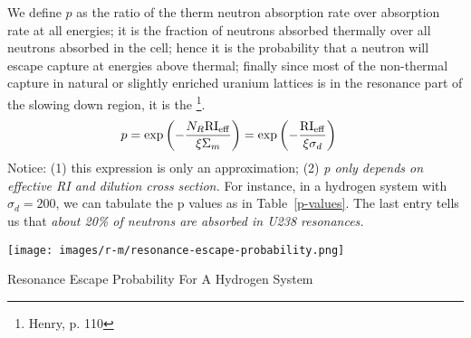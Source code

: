 \documentclass{school-22.211-notes}
\begin{document}
\clearpage
{}
We define $p$ as the ratio of the therm neutron absorption rate over absorption rate at all energies; it is the fraction of neutrons absorbed thermally over all neutrons absorbed in the cell; hence it is the probability that a neutron will escape capture at energies above thermal; finally since most of the non-thermal capture in natural or slightly enriched uranium lattices is in the resonance part of the slowing down region, it is the \footnote{Henry, p. 110}. 
\begin{align}
p &= \exp \left( - \frac{N_R \mathrm{RI}_{\mathrm{eff}}}{\xi \Sigma_m} \right)  = \exp \left( - \frac{\mathrm{RI}_{\mathrm{eff}}}{\xi \sigma_d} \right)
\end{align}
Notice: (1) this expression is only an approximation; (2) \textit{p only depends on effective RI and dilution cross section.} For instance, in a hydrogen system with $\sigma_d = 200$, we can tabulate the p values as in Table~\ref{p-values}. The last entry tells us that \textit{about 20\% of neutrons are absorbed in U238 resonances.}
\begin{table}
  \centering
  \texttt{[image: images/r-m/resonance-escape-probability.png]}
  \caption{Resonance Escape Probability For A Hydrogen System} \label{p-values}
\end{table}
\end{document}
